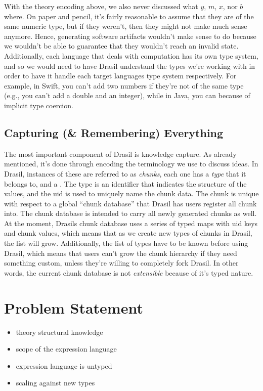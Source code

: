 With the theory encoding above, we also never discussed what \(y\), \(m\),
\(x\), nor \(b\) where. On paper and pencil, it's fairly reasonable to assume
that they are of the same numeric type, but if they weren't, then they might not
make much sense anymore. Hence, generating software artifacts wouldn't make
sense to do because we wouldn't be able to guarantee that they wouldn't reach an
invalid state. Additionally, each language that deals with computation has its
own type system, and so we would need to have Drasil understand the types we're
working with in order to have it handle each target languages type system
respectively. For example, in Swift, you can't add two numbers if they're not of
the same type (e.g., you can't add a double and an integer), while in Java, you
can because of implicit type coercion.

\subsection{Capturing (\& Remembering) Everything}

The most important component of Drasil is knowledge capture. As already
mentioned, it's done through encoding the terminology we use to discuss ideas.
In Drasil, instances of these are referred to as \textit{chunks}, each one has a
\textit{type} that it belongs to, and a . The type is an identifier
that indicates the structure of the values, and the \acs{uid} is used to
uniquely name the chunk data. The chunk is unique with respect to a global
``chunk database'' that Drasil has users register all chunk into. The chunk
database is intended to carry all newly generated chunks as well. At the moment,
Drasils chunk database uses a series of typed maps with \acs{uid} keys and chunk
values, which means that as we create new types of chunks in Drasil, the list
will grow. Additionally, the list of types have to be known before using Drasil,
which means that users can't grow the chunk hierarchy if they need something
custom, unless they're willing to completely fork Drasil. In other words, the
current chunk database is not \textit{extensible} because of it's typed nature.

\section{Problem Statement}
\label{sec:intro:problemStatement}


\begin{itemize}
      \item theory structural knowledge
      \item scope of the expression language
      \item expression language is untyped
      \item scaling against new types
\end{itemize}

